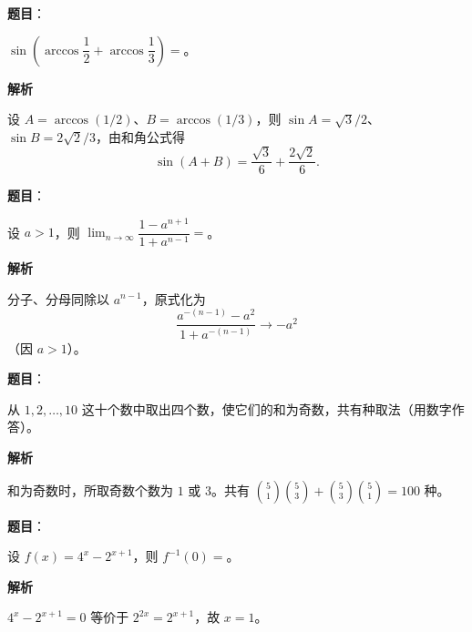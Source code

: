 \begin{answer}

\textbf{题目}：

$\displaystyle\sin\left(\arccos\dfrac12+\arccos\dfrac13\right)=$\underline{\qquad\qquad}。

\textbf{解析}

设 $A=\arccos(1/2)$、$B=\arccos(1/3)$，则 $\sin A=\sqrt3/2$、$\sin B=2\sqrt2/3$，由和角公式得
\nopagebreak[4]
\[
\sin(A+B)=\frac{\sqrt3}{6}+\frac{2\sqrt2}{6}.
\]


\end{answer}
\begin{answer}

\textbf{题目}：

设 $a>1$，则 $\displaystyle\lim_{n\to\infty}\dfrac{1-a^{n+1}}{1+a^{n-1}}=$\underline{\qquad\qquad}。

\textbf{解析}

分子、分母同除以 $a^{n-1}$，原式化为
\nopagebreak[4]
\[
\frac{a^{-(n-1)}-a^2}{1+a^{-(n-1)}}\longrightarrow-a^2
\]
（因 $a>1$）。


\end{answer}
\begin{answer}

\textbf{题目}：

从 $1,2,\ldots,10$ 这十个数中取出四个数，使它们的和为奇数，共有\underline{\qquad\qquad}种取法（用数字作答）。

\textbf{解析}

和为奇数时，所取奇数个数为 $1$ 或 $3$。共有
$\binom51\binom53+\binom53\binom51=100$ 种。


\end{answer}
\begin{answer}

\textbf{题目}：

设 $f(x)=4^x-2^{x+1}$，则 $f^{-1}(0)=$\underline{\qquad\qquad}。

\textbf{解析}

$4^x-2^{x+1}=0$ 等价于 $2^{2x}=2^{x+1}$，故 $x=1$。


\end{answer}
